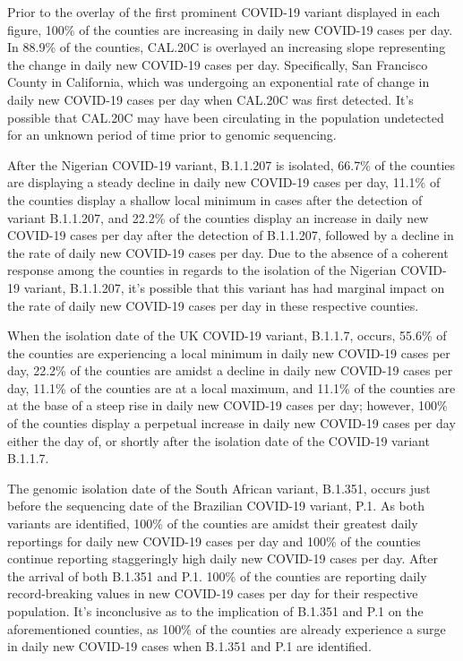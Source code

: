\documentclass[]{article}
\begin{document}
 \indent Prior to the overlay of the first prominent COVID-19 variant displayed in each figure, 100\% of the counties are increasing in daily new COVID-19 cases per day. In 88.9\% of the counties, CAL.20C is overlayed an increasing slope representing the change in daily new COVID-19 cases per day. Specifically, San Francisco County in California, which was undergoing an exponential rate of change in daily new COVID-19 cases per day when CAL.20C was first detected. It's possible that CAL.20C may have been circulating in the population undetected for an unknown period of time prior to genomic sequencing.
 
 \indent After the Nigerian COVID-19 variant, B.1.1.207 is isolated, 66.7\% of the counties are displaying a steady decline in daily new COVID-19 cases per day, 11.1\% of the counties display a shallow local minimum in cases after the detection of variant B.1.1.207, and 22.2\% of the counties display an increase in daily new COVID-19 cases per day after the detection of B.1.1.207, followed by a decline in the rate of daily new COVID-19 cases per day. Due to the absence of a coherent response among the counties in regards to the isolation of the Nigerian COVID-19 variant, B.1.1.207, it's possible that this variant has had marginal impact on the rate of daily new COVID-19 cases per day in these respective counties.
 
 \indent When the isolation date of the UK COVID-19 variant, B.1.1.7, occurs, 55.6\% of the counties are experiencing a local minimum in daily new COVID-19 cases per day, 22.2\% of the counties are amidst a decline in daily new COVID-19 cases per day, 11.1\% of the counties are at a local maximum, and 11.1\% of the counties are at the base of a steep rise in daily new COVID-19 cases per day; however, 100\% of the counties display a perpetual increase in daily new COVID-19 cases per day either the day of, or shortly after the isolation date of the COVID-19 variant B.1.1.7.
 
 \indent The genomic isolation date of the South African variant, B.1.351, occurs just before the sequencing date of the Brazilian COVID-19 variant, P.1. As both variants are identified, 100\% of the counties are amidst their greatest daily reportings for daily new COVID-19 cases per day and 100\% of the counties continue reporting staggeringly high daily new COVID-19 cases per day. After the arrival of both B.1.351 and P.1. 100\% of the counties are reporting daily record-breaking values in new COVID-19 cases per day for their respective population. It's inconclusive as to the implication of B.1.351 and P.1 on the aforementioned counties, as 100\% of the counties are already experience a surge in daily new COVID-19 cases when B.1.351 and P.1 are identified. 
 
\end{document}
